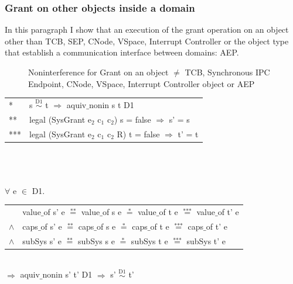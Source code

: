 \documentclass[pdftex,11pt,a4paper,twoside]{article}
\begin{document}
\subsubsection{Grant on other objects inside a domain} 
In this paragraph I show that an execution of the grant operation on an object other than TCB, SEP, CNode, VSpace, Interrupt Controller or the object type that establish a communication interface between domains: AEP.
\begin{flushleft}
\begin{figure}[H]
\caption{Noninterference for Grant on an object $\neq$ TCB, Synchronous IPC Endpoint, CNode, VSpace, Interrupt Controller object or AEP}
\end{figure}
\end{flushleft}
\begin{tabular}{ll}
* & s $\overset{\text{D1}}{\sim}$ t $\Rightarrow$ aquiv$\_$nonin s t D1	\\ 
** & legal (SysGrant e$_2$ c$_1$ c$_2$) s = false $\Rightarrow$ s' = s \\ 
*** & legal (SysGrant e$_2$ c$_1$ c$_2$ R) t = false $\Rightarrow$ t' = t
\end{tabular}\\ \\ \\
$\forall$ e $\in$ D1. \\ 
\begin{tabular}{ll}
& value$\_$of s' e $\overset{\text{**}}{=}$ value$\_$of s e $\overset{\text{*}}{=}$ value$\_$of t e $\overset{\text{***}}{=}$ value$\_$of t' e \\
$\wedge$ & caps$\_$of s' e $\overset{\text{**}}{=}$ caps$\_$of s e $\overset{\text{*}}{=}$ caps$\_$of t e $\overset{\text{***}}{=}$ caps$\_$of t' e \\
$\wedge$ & subSys s' e $\overset{\text{**}}{=}$ subSys s e $\overset{\text{*}}{=}$ subSys t e $\overset{\text{***}}{=}$ subSys t' e
\end{tabular} \\
$\Rightarrow$ aquiv$\_$nonin s' t' D1 $\Rightarrow$ s' $\overset{\text{D1}}{\sim}$ t' 
\end{document}
